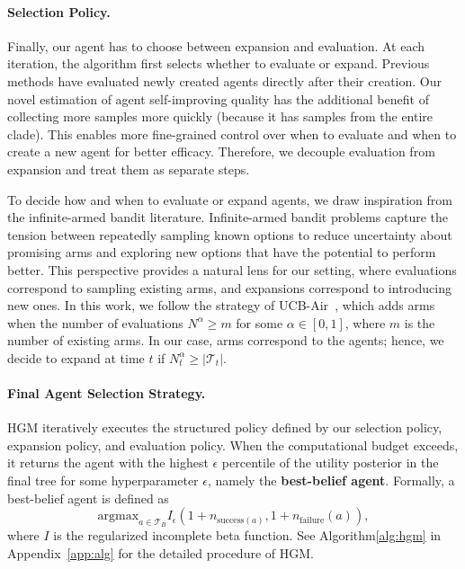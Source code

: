 \documentclass{article} %
\begin{document}
\paragraph{Selection Policy.}

Finally, our agent has to choose between expansion and evaluation.
At each iteration, the algorithm first selects whether to evaluate or expand. Previous methods have evaluated newly created agents directly after their creation. 
Our novel estimation of agent self-improving quality has the additional benefit of collecting more samples more quickly (because it has samples from the entire clade). 
This enables more fine-grained control over when to evaluate and when to create a new agent for better efficacy. 
Therefore, we decouple evaluation from expansion and treat them as separate steps.

To decide how and when to evaluate or expand agents, we draw inspiration from the infinite-armed bandit literature. Infinite-armed bandit problems capture the tension between repeatedly sampling known options to reduce uncertainty about promising arms and exploring new options that have the potential to perform better. This perspective provides a natural lens for our setting, where evaluations correspond to sampling existing arms, and expansions correspond to introducing new ones.
In this work, we follow the strategy of UCB-Air~\citep{NIPS200849ae49a2}, which adds arms when the number of evaluations $N^\alpha \geq m$ for some $\alpha \in [0, 1]$, where $m$ is the number of existing arms. In our case, arms correspond to the agents; hence, we decide to expand at time $t$ if $N_t^\alpha \geq |\mathcal{T}_t|$.



\paragraph{Final Agent Selection Strategy.}\label{method:final-agent-select}
HGM iteratively executes the structured policy defined by our selection policy, expansion policy, and evaluation policy. When the computational budget exceeds, it returns the agent with the highest $\epsilon$ percentile of the utility posterior in the final tree for some hyperparameter $\epsilon$, namely the \textbf{best-belief agent}. Formally, a best-belief agent is defined as
\[
\text{argmax}_{a\in \mathcal{T}_B} I_\epsilon(1 + n_{\text{success}(a)}, 1 + n_{\text{failure}}(a)),
\]
where $I$ is the regularized incomplete beta function. See Algorithm\ref{alg:hgm} in Appendix~\ref{app:alg} for the detailed procedure of HGM.
\end{document}
